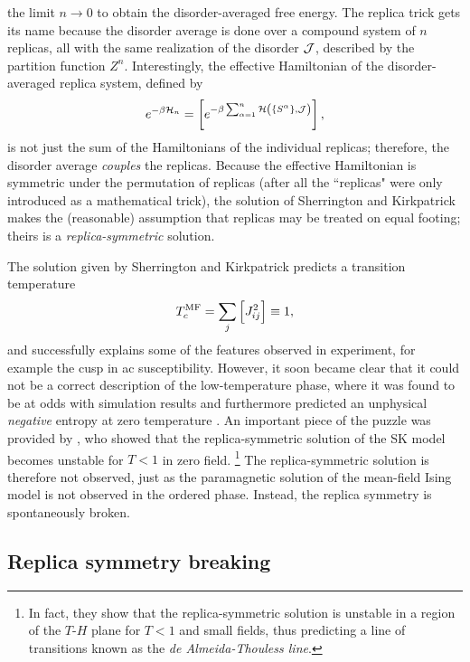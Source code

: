 the limit $n \to 0$ to obtain the disorder-averaged free energy. The replica
trick gets its name because the disorder average is done over a compound system
of $n$ replicas, all with the same realization of the disorder $\mathcal{J}$, described
by the partition function $Z^n$. Interestingly, the effective Hamiltonian of
the disorder-averaged replica system, defined by
\begin{equation}
  e^{-\beta\ham_n} =
  \davc{e^{-\beta\sum_{\alpha=1}^n
  \ham\del{\cbr{S^{\alpha}},\JJ}}},
\end{equation}
is not just the sum of the Hamiltonians of the individual replicas; therefore,
the disorder average \emph{couples} the replicas. Because the effective
Hamiltonian is symmetric under the permutation of replicas (after all the
``replicas" were only introduced as a mathematical trick), the solution of
Sherrington and Kirkpatrick makes the (reasonable) assumption that replicas may
be treated on equal footing; theirs is a \emph{replica-symmetric} solution.

The solution given by Sherrington and Kirkpatrick predicts a transition
temperature
\begin{equation}
  T_c^{\mathrm{MF}} = \sum_j \left[J_{ij}^2\right] \equiv 1,
\end{equation}
and successfully explains some of the features observed in experiment, for
example the cusp in ac susceptibility. However, it soon became clear that it
could not be a correct description of the low-temperature phase, where it was
found to be at odds with simulation results and furthermore predicted an
unphysical \emph{negative} entropy at zero temperature
\autocite{kirkpatrick1978infinite}. An important piece of the puzzle was
provided by \textcite{dealmeida1978stability}, who showed that the
replica-symmetric solution of the SK model becomes unstable for $T<1$ in zero
field.%
\footnote{
  In fact, they show that the replica-symmetric solution is unstable in a
  region of the $T$-$H$ plane for $T<1$ and small fields, thus predicting
  a line of transitions known as the \emph{de Almeida-Thouless line}.
}
The replica-symmetric solution is therefore not observed, just as the
paramagnetic solution of the mean-field Ising model is not observed in the
ordered phase. Instead, the replica symmetry is spontaneously broken.


\subsection{Replica symmetry breaking}
\label{sec:intro-rsb}

